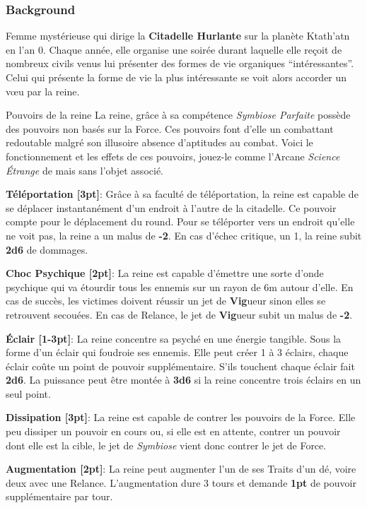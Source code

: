 \subsubsection{Background}
Femme mystérieuse qui dirige la \textbf{Citadelle Hurlante} sur la planète Ktath’atn en l’an 0. Chaque année, elle organise une soirée durant laquelle elle reçoit de nombreux civils venus lui présenter des formes de vie organiques “intéressantes”. Celui qui présente la forme de vie la plus intéressante se voit alors accorder un vœu par la reine.
\newpage
\begin{paperbox}{Pouvoirs de la reine}
La reine, grâce à sa compétence \textit{Symbiose Parfaite} possède des pouvoirs non basés sur la Force. Ces pouvoirs font d’elle un combattant redoutable malgré son illusoire absence d’aptitudes au combat. Voici le fonctionnement et les effets de ces pouvoirs, jouez-le comme l’Arcane \textit{Science \'Etrange} de  mais sans l’objet associé.
\bigbreak
\begin{rebelist}
    \item \textbf{Téléportation [3pt]}: Grâce à sa faculté de téléportation, la reine est capable de se déplacer instantanément d’un endroit à l’autre de la citadelle. Ce pouvoir compte pour le déplacement du round. Pour se téléporter vers un endroit qu’elle ne voit pas, la reine a un malus de \textbf{-2}. En cas d’échec critique, un 1, la reine subit \textbf{2d6} de dommages.
    \item \textbf{Choc Psychique [2pt]}: La reine est capable d’émettre une sorte d’onde psychique qui va étourdir tous les ennemis sur un rayon de 6m autour d’elle. En cas de succès, les victimes doivent réussir un jet de \textbf{Vig}ueur sinon elles se retrouvent secouées. En cas de Relance, le jet de \textbf{Vig}ueur subit un malus de \textbf{-2}.
    \item \textbf{\'Eclair [1-3pt]}: La reine concentre sa psyché en une énergie tangible. Sous la forme d’un éclair qui foudroie ses ennemis. Elle peut créer 1 à 3 éclairs, chaque éclair coûte un point de pouvoir supplémentaire. S’ils touchent chaque éclair fait \textbf{2d6}. La puissance peut être montée à \textbf{3d6} si la reine concentre trois éclairs en un seul point.
    \item \textbf{Dissipation [3pt]}: La reine est capable de contrer les pouvoirs de la Force. Elle peu dissiper un pouvoir en cours ou, si elle est en attente, contrer un pouvoir dont elle est la cible, le jet de \textit{Symbiose} vient donc contrer le jet de Force.
    \item \textbf{Augmentation [2pt]}: La reine peut augmenter l’un de ses Traits d’un dé, voire deux avec une Relance. L’augmentation dure 3 tours et demande \textbf{1pt} de pouvoir supplémentaire par tour.
\end{rebelist}
\end{paperbox}
\newpage

